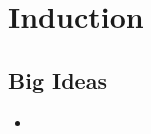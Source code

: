 \chapter{Induction}
\label{chap:I}

\section{Big Ideas}
\label{sec:I Big Ideas}
\begin{itemize}
  \item 
\end{itemize}